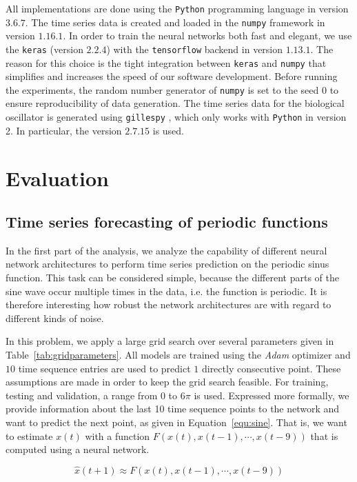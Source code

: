 \documentclass{article}
\begin{document}
All implementations are done using the \texttt{Python} programming language in
version $3.6.7$. The time series data is created and loaded in the
\texttt{numpy} framework in version $1.16.1$. In order to train the neural
networks both fast and elegant, we use the \texttt{keras} (version $2.2.4$)
with the
\texttt{tensorflow} backend in version $1.13.1$.
The reason for this choice is the tight
integration between \texttt{keras} and \texttt{numpy} that simplifies and
increases the speed of our software development. Before running the experiments,
the random number generator of \texttt{numpy} is set to the seed $0$ to ensure
reproducibility of data generation.
The time series data for the biological oscillator 
is generated using \texttt{gillespy} \cite{abel2016}, which only works with 
\texttt{Python} in version 2. In particular, the version $2.7.15$ is used.


\section{Evaluation}
\subsection{Time series forecasting of periodic functions}
\label{sec:sine}
In the first part of the analysis, we analyze the capability of different neural
network architectures to perform time series prediction on the periodic sinus
function. This task can be considered simple, because the different parts of the
sine wave occur multiple times in the data, i.e. the function is periodic.
It is therefore interesting how
robust the network architectures are with regard to different kinds of noise.

In this problem, we apply a large grid search over several parameters given in
Table~\ref{tab:gridparameters}. All models are trained using the \emph{Adam}
optimizer and $10$ time sequence entries are used to predict $1$ directly
consecutive point. These assumptions are made in order to keep the grid search
feasible. For training, testing and validation, a range from $0$ to $6 \pi$ is
used. Expressed more formally,
we provide information about the last 10 time sequence points
to the network and want to predict the next point, as given in
Equation~\ref{equ:sine}. That is, we want to estimate $x(t)$ with a function
$F(x(t), x(t-1), \cdots, x(t-9))$ that is computed using a neural network.

\begin{equation}
    \hat{x} (t + 1) \approx F(x(t), x(t-1), \cdots, x(t-9))
    \label{equ:sine}
\end{equation}
\end{document}
